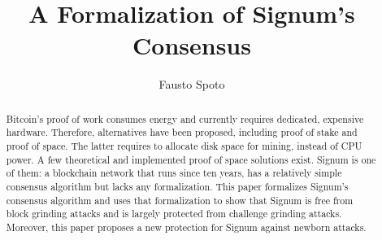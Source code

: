 \documentclass[orivec]{llncs}
\begin{document}
%
\begin{frontmatter}

  \title{A Formalization of Signum's Consensus}

  \author{Fausto Spoto}

  \maketitle

  \begin{abstract}
    Bitcoin's proof of work consumes energy and currently requires
    dedicated, expensive hardware. Therefore, alternatives have been proposed,
    including proof of stake and proof of space. The latter requires to allocate
    disk space for mining, instead of CPU power. A few theoretical and
    implemented proof of space solutions exist. Signum is one of them:
    a blockchain network that runs since ten years, has a relatively simple
    consensus algorithm but lacks any formalization.
    This paper formalizes Signum's consensus algorithm and uses that formalization
    to show that Signum is free from block grinding attacks and is largely
    protected from challenge grinding attacks. Moreover, this paper proposes
    a new protection for Signum against newborn attacks.
  \end{abstract}

\end{frontmatter}














\end{document}
